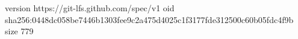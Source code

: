 version https://git-lfs.github.com/spec/v1
oid sha256:0448dc058be7446b1303fee9c2a475d4025c1f3177fde312500c60b05fdc4f9b
size 779
